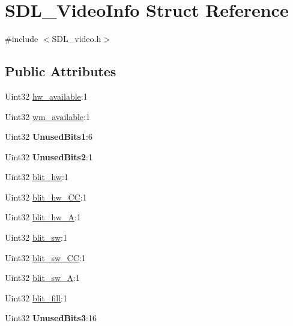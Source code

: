 \hypertarget{structSDL__VideoInfo}{\section{S\+D\+L\+\_\+\+Video\+Info Struct Reference}
\label{structSDL__VideoInfo}
}


{\ttfamily \#include $<$S\+D\+L\+\_\+video.\+h$>$}

\subsection*{Public Attributes}
\begin{DoxyCompactItemize}
\item 
Uint32 \hyperlink{structSDL__VideoInfo_a515e38f0a122a45fe67230e3929670f5}{hw\+\_\+available}\+:1
\item 
Uint32 \hyperlink{structSDL__VideoInfo_aa7dee6b91b73acd0476d67d7036669e9}{wm\+\_\+available}\+:1
\item 
\hypertarget{structSDL__VideoInfo_a1aeb1f930953b9d32a56f978047b5f27}{Uint32 {\bfseries Unused\+Bits1}\+:6}\label{structSDL__VideoInfo_a1aeb1f930953b9d32a56f978047b5f27}

\item 
\hypertarget{structSDL__VideoInfo_add1b831a063c0a4aed3f2f496096374b}{Uint32 {\bfseries Unused\+Bits2}\+:1}\label{structSDL__VideoInfo_add1b831a063c0a4aed3f2f496096374b}

\item 
Uint32 \hyperlink{structSDL__VideoInfo_afd985d7ee038d978694ebe0203338837}{blit\+\_\+hw}\+:1
\item 
Uint32 \hyperlink{structSDL__VideoInfo_af62ba97a72e925000dde2ea27c854b7f}{blit\+\_\+hw\+\_\+\+C\+C}\+:1
\item 
Uint32 \hyperlink{structSDL__VideoInfo_a2153563e63065ba5a66836ad03f0cd68}{blit\+\_\+hw\+\_\+\+A}\+:1
\item 
Uint32 \hyperlink{structSDL__VideoInfo_aa7dc499b5b1bea4bdb4de04bd58fc796}{blit\+\_\+sw}\+:1
\item 
Uint32 \hyperlink{structSDL__VideoInfo_aafaf9067d0b70d78ec9d58c32895b62e}{blit\+\_\+sw\+\_\+\+C\+C}\+:1
\item 
Uint32 \hyperlink{structSDL__VideoInfo_ad8319697999a5d00f551e2b7547f17aa}{blit\+\_\+sw\+\_\+\+A}\+:1
\item 
Uint32 \hyperlink{structSDL__VideoInfo_ab0453880653b45226638e1ee34fceb56}{blit\+\_\+fill}\+:1
\item 
\hypertarget{structSDL__VideoInfo_a647dc6f87a620ac1f4d7075a0f7063c7}{Uint32 {\bfseries Unused\+Bits3}\+:16}\label{structSDL__VideoInfo_a647dc6f87a620ac1f4d7075a0f7063c7}


\end{DoxyCompactItemize}
